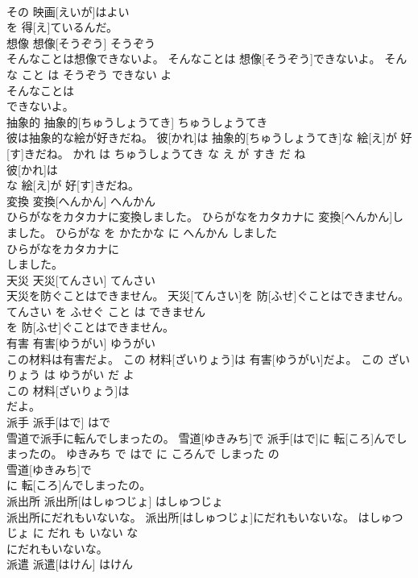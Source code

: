 \documentclass[8pt]{extreport}
\begin{document}
\begin{CJK}{UTF8}{min}
\\	その 映画[えいが]はよい
\\	を 得[え]ているんだ。			
\\	想像	想像[そうぞう]	そうぞう	
\\	そんなことは想像できないよ。	そんなことは 想像[そうぞう]できないよ。	そんな こと は そうぞう できない よ	
\\	そんなことは
\\	できないよ。			
\\	抽象的	抽象的[ちゅうしょうてき]	ちゅうしょうてき	
\\	彼は抽象的な絵が好きだね。	彼[かれ]は 抽象的[ちゅうしょうてき]な 絵[え]が 好[す]きだね。	かれ は ちゅうしょうてき な え が すき だ ね	
\\	彼[かれ]は
\\	な 絵[え]が 好[す]きだね。			
\\	変換	変換[へんかん]	へんかん	
\\	ひらがなをカタカナに変換しました。	ひらがなをカタカナに 変換[へんかん]しました。	ひらがな を かたかな に へんかん しました	
\\	ひらがなをカタカナに
\\	しました。			
\\	天災	天災[てんさい]	てんさい	
\\	天災を防ぐことはできません。	天災[てんさい]を 防[ふせ]ぐことはできません。	てんさい を ふせぐ こと は できません	
\\	を 防[ふせ]ぐことはできません。			
\\	有害	有害[ゆうがい]	ゆうがい	
\\	この材料は有害だよ。	この 材料[ざいりょう]は 有害[ゆうがい]だよ。	この ざいりょう は ゆうがい だ よ	
\\	この 材料[ざいりょう]は
\\	だよ。			
\\	派手	派手[はで]	はで	
\\	雪道で派手に転んでしまったの。	雪道[ゆきみち]で 派手[はで]に 転[ころ]んでしまったの。	ゆきみち で はで に ころんで しまった の	
\\	雪道[ゆきみち]で
\\	に 転[ころ]んでしまったの。			
\\	派出所	派出所[はしゅつじょ]	はしゅつじょ	
\\	派出所にだれもいないな。	派出所[はしゅつじょ]にだれもいないな。	はしゅつじょ に だれ も いない な	
\\	にだれもいないな。			
\\	派遣	派遣[はけん]	はけん	

\end{CJK}
\end{document}
